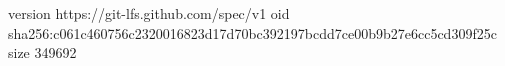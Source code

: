 version https://git-lfs.github.com/spec/v1
oid sha256:c061c460756c2320016823d17d70bc392197bcdd7ce00b9b27e6cc5cd309f25c
size 349692
